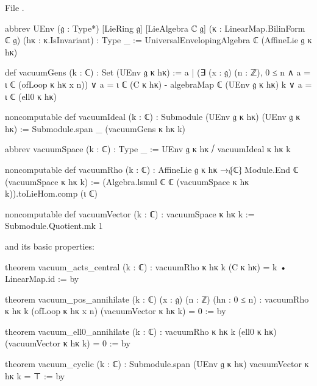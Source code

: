 File .
\begin{leancode}
abbrev UEnv (𝔤 : Type*) [LieRing 𝔤] [LieAlgebra ℂ 𝔤]
    (κ : LinearMap.BilinForm ℂ 𝔤) (hκ : κ.IsInvariant) : Type _ :=
  UniversalEnvelopingAlgebra ℂ (AffineLie 𝔤 κ hκ)

def vacuumGens (k : ℂ) : Set (UEnv 𝔤 κ hκ) :=
  {a | (∃ (x : 𝔤) (n : ℤ), 0 ≤ n ∧ a = ι ℂ (ofLoop κ hκ x n))
        ∨ a = ι ℂ (C κ hκ) - algebraMap ℂ (UEnv 𝔤 κ hκ) k
        ∨ a = ι ℂ (ell0 κ hκ)}

noncomputable def vacuumIdeal (k : ℂ) : Submodule (UEnv 𝔤 κ hκ) (UEnv 𝔤 κ hκ) :=
  Submodule.span _ (vacuumGens κ hκ k)

abbrev vacuumSpace (k : ℂ) : Type _ := UEnv 𝔤 κ hκ ⧸ vacuumIdeal κ hκ k

noncomputable def vacuumRho (k : ℂ) :
    AffineLie 𝔤 κ hκ →ₗ⁅ℂ⁆ Module.End ℂ (vacuumSpace κ hκ k) :=
  (Algebra.lsmul ℂ ℂ (vacuumSpace κ hκ k)).toLieHom.comp (ι ℂ)

noncomputable def vacuumVector (k : ℂ) : vacuumSpace κ hκ k := Submodule.Quotient.mk 1
\end{leancode}
and its basic properties:
\begin{leancode}
theorem vacuum_acts_central (k : ℂ) :
    vacuumRho κ hκ k (C κ hκ) = k • LinearMap.id := by

theorem vacuum_pos_annihilate (k : ℂ) (x : 𝔤) (n : ℤ) (hn : 0 ≤ n) :
    vacuumRho κ hκ k (ofLoop κ hκ x n) (vacuumVector κ hκ k) = 0 := by

theorem vacuum_ell0_annihilate (k : ℂ) :
    vacuumRho κ hκ k (ell0 κ hκ) (vacuumVector κ hκ k) = 0 := by

theorem vacuum_cyclic (k : ℂ) :
    Submodule.span (UEnv 𝔤 κ hκ) {vacuumVector κ hκ k} = ⊤ := by
\end{leancode}

